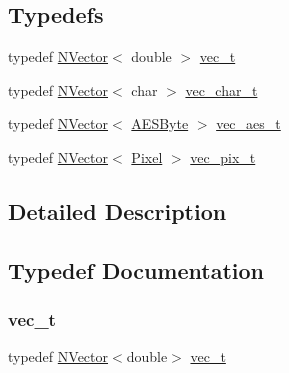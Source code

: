 \subsection*{Typedefs}
\begin{DoxyCompactItemize}
\item 
typedef \mbox{\hyperlink{class_n_vector}{N\+Vector}}$<$ double $>$ \mbox{\hyperlink{group___n_algebra_ga0a2cfc67e738a3d73e4f12098c4c07f6}{vec\+\_\+t}}
\item 
typedef \mbox{\hyperlink{class_n_vector}{N\+Vector}}$<$ char $>$ \mbox{\hyperlink{group___n_algebra_ga4be4d9f61d1c170b61a0a4bdeccac8f1}{vec\+\_\+char\+\_\+t}}
\item 
typedef \mbox{\hyperlink{class_n_vector}{N\+Vector}}$<$ \mbox{\hyperlink{class_a_e_s_byte}{A\+E\+S\+Byte}} $>$ \mbox{\hyperlink{group___n_algebra_gad347c291514f4b97d883742568d3f8a7}{vec\+\_\+aes\+\_\+t}}
\item 
typedef \mbox{\hyperlink{class_n_vector}{N\+Vector}}$<$ \mbox{\hyperlink{class_pixel}{Pixel}} $>$ \mbox{\hyperlink{group___n_algebra_gabd4c731d10a091af31f8476c9143c453}{vec\+\_\+pix\+\_\+t}}
\end{DoxyCompactItemize}


\subsection{Detailed Description}


\subsection{Typedef Documentation}
\mbox{\label{group___n_algebra_ga0a2cfc67e738a3d73e4f12098c4c07f6}} 
\subsubsection{\texorpdfstring{vec\_t}{vec\_t}}
{\footnotesize\ttfamily typedef \mbox{\hyperlink{class_n_vector}{N\+Vector}}$<$double$>$ \mbox{\hyperlink{group___n_algebra_ga0a2cfc67e738a3d73e4f12098c4c07f6}{vec\+\_\+t}}}

\mbox{\label{group___n_algebra_ga4be4d9f61d1c170b61a0a4bdeccac8f1}} 

